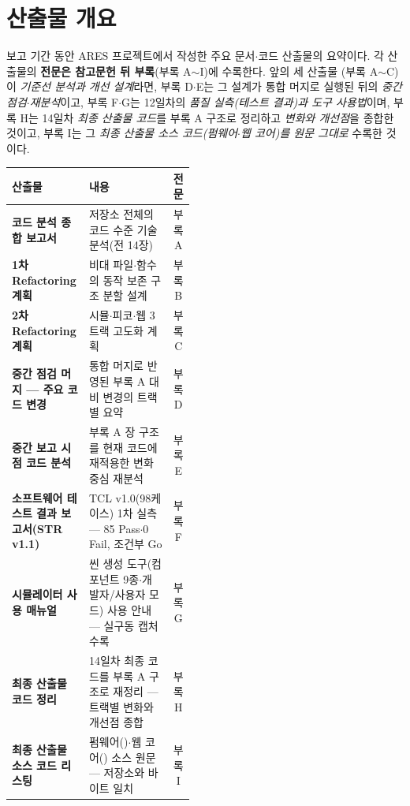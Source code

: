 
\chapter{산출물 개요}
보고 기간 동안 ARES 프로젝트에서 작성한 주요 문서$\cdot$코드 산출물의 요약이다.
각 산출물의 \textbf{전문은 참고문헌 뒤 부록}(부록 A$\sim$I)에 수록한다. 앞의 세 산출물
(부록 A$\sim$C)이 \emph{기준선 분석과 개선 설계}라면, 부록 D$\cdot$E는 그 설계가 통합
머지로 실행된 뒤의 \emph{중간 점검$\cdot$재분석}이고, 부록 F$\cdot$G는 12일차의
\emph{품질 실측(테스트 결과)과 도구 사용법}이며, 부록 H는 14일차 \emph{최종 산출물
코드}를 부록 A 구조로 정리하고 \emph{변화와 개선점}을 종합한 것이고, 부록 I는 그
\emph{최종 산출물 소스 코드(펌웨어$\cdot$웹 코어)를 원문 그대로} 수록한 것이다.

\begin{center}
\renewcommand{\arraystretch}{1.3}
\begin{tabularx}{\linewidth}{@{}>{\sffamily\bfseries}l L{0.46\linewidth} >{\sffamily}c@{}}
\toprule
산출물 & 내용 & 전문 \\
\midrule
코드 분석 종합 보고서 & 저장소 전체의 코드 수준 기술 분석(전 14장) & 부록 A \\
1차 Refactoring 계획 & 비대 파일$\cdot$함수의 동작 보존 구조 분할 설계 & 부록 B \\
2차 Refactoring 계획 & 시뮬$\cdot$피코$\cdot$웹 3트랙 고도화 계획 & 부록 C \\
중간 점검 머지 --- 주요 코드 변경 & 통합 머지로 반영된 부록 A 대비 변경의 트랙별 요약 & 부록 D \\
중간 보고 시점 코드 분석 & 부록 A 장 구조를 현재 코드에 재적용한 변화 중심 재분석 & 부록 E \\
소프트웨어 테스트 결과 보고서(STR v1.1) & TCL v1.0(98케이스) 1차 실측 --- 85 Pass$\cdot$0 Fail, 조건부 Go & 부록 F \\
시뮬레이터 사용 매뉴얼 & 씬 생성 도구(컴포넌트 9종$\cdot$개발자/사용자 모드) 사용 안내 --- 실구동 캡처 수록 & 부록 G \\
최종 산출물 코드 정리 & 14일차 최종 코드를 부록 A 구조로 재정리 --- 트랙별 변화와 개선점 종합 & 부록 H \\
최종 산출물 소스 코드 리스팅 & 펌웨어()$\cdot$웹 코어() 소스 원문 --- 저장소와 바이트 일치 & 부록 I \\
\bottomrule
\end{tabularx}
\end{center}

